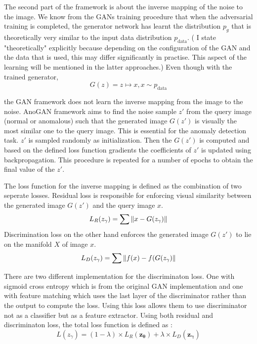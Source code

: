 The second part of the framework is about the inverse mapping of the noise to the image. We know
from the GANs training procedure that when the adversarial training is completed, the generator
network has learnt the distribution $p_g$ that is theoretically very similar to the input data
distribution $p_{\text{data}}$. ( I state "theoretically" explicitly because depending on the
configuration of the GAN and the data that is used, this may differ significantly in practise. This
aspect of the learning will be mentioned in the latter approaches.) Even though with the trained
generator, 
$$
G(z) = z \mapsto x,x \sim p_{\text{data}}
$$

the GAN framework does not learn the inverse mapping from the image to the noise. AnoGAN framework
aims to find the noise sample $z\prime$ from the query image (normal or anomalous) such that the
generated image $G(z\prime)$ is visually the most similar one to the query image. This is essential
for the anomaly detection task. $z\prime$ is sampled randomly as initialization. Then the
$G(z\prime)$ is computed and based on the defined loss function gradients the coefficients of
$z\prime$ is updated using backpropagation. This procedure is repeated for a number of epochs to
obtain the final value of the $z\prime$. 

The loss function for the inverse mapping is defined as the combination of two seperate losses.
Residual loss is responsible for enforcing visual similarity between the generated image
$G(z\prime)$ and the query image $x$.
\begin{equation}
    \label{eqn:anogan_rl}
    L_R (z_{\gamma}) = \sum \left\lVert x - G(z_{\gamma})\right\rVert
\end{equation} 
Discrimination loss on the other hand enforces the
generated image $G(z\prime)$ to lie on the manifold $X$ of image $x$.
\begin{equation}
    \label{eqn:anogan_dl}
    L_D (z_{\gamma}) = \sum  \left\lVert f(x) - f(G(z_{\gamma})\right\rVert
\end{equation}

There are two different implementation for the discriminaton loss. One with sigmoid cross entropy
which is from the original GAN implementation \cite{Goodfellow:2014:GAN:2969033.2969125} and one
with feature matching \cite{fm} which uses the last layer of the discriminator rather than the
output to compute the loss. Using this loss allows them to use discriminator not as a classifier but
as a feature extractor. Using both residual and discriminaton loss, the total loss function is
defined as :
$$L(z_{\gamma}) = (1 - \lambda ) \times L_{R}(\boldsymbol{z_{\theta}}) + \lambda \times
L_{D}(\boldsymbol{z_{\gamma}})$$


